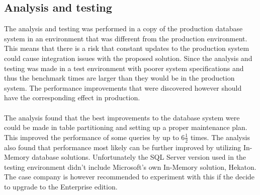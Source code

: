 \documentclass{cslthse-msc}
\begin{document}
\subsection{Analysis and testing}
The analysis and testing was performed in a copy of the production database system in an environment that was different from the production environment. This means that there is a risk that constant updates to the production system could cause integration issues with the proposed solution.
Since the analysis and testing was made in a test environment with poorer system specifications and thus the benchmark times are larger than they would be in the production system. The performance improvements that were discovered however should have the corresponding effect in production.\\\\ The analysis found that the best improvements to the database system were could be made in table partitioning and setting up a proper maintenance plan. This improved the performance of some queries by up to $6\frac{1}{2}$ times. The analysis also found that performance most likely can be further improved by utilizing In-Memory database solutions. Unfortunately the SQL Server version used in the testing environment didn't include Microsoft's own In-Memory solution, Hekaton. The case company is however recommended to experiment with this if the decide to upgrade to the Enterprise edition. 




\end{document}
